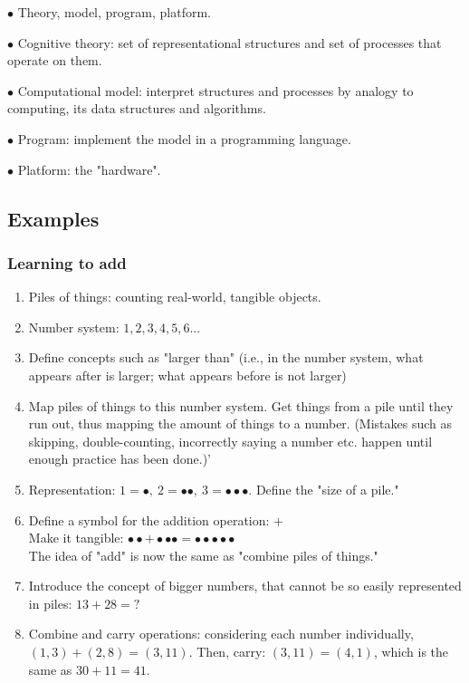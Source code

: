 \documentclass[english,openany]{book}
\begin{document}
$\bullet$ Theory, model, program, platform.

$\bullet$ Cognitive theory: set of representational structures and set of processes that operate on them.

$\bullet$ Computational model: interpret structures and processes by analogy to computing, its data structures and algorithms.

$\bullet$ Program: implement the model in a programming language.

$\bullet$ Platform: the "hardware".

\subsection{Examples}

\subsubsection{Learning to add}

\begin{enumerate}
    \item Piles of things: counting real-world, tangible objects.

    \item Number system: $1, 2, 3, 4, 5, 6...$

    \item Define concepts such as "larger than" (i.e., in the number system, what appears after is larger; what appears before is not larger)
    
    \item Map piles of things to this number system. Get things from a pile until they run out, thus mapping the amount of things to a number. (Mistakes such as skipping, double-counting, incorrectly saying a number etc. happen until enough practice has been done.)'
    
    \item Representation: $1 = \bullet,\ 2 = \bullet \bullet,\ 3 = \bullet \bullet \bullet$. Define the "size of a pile."
    
    \item Define a symbol for the addition operation: $+$\\ Make it tangible: $\bullet \bullet + \bullet \bullet \bullet = \bullet \bullet \bullet \bullet \bullet$\\
    The idea of "add" is now the same as "combine piles of things."
    
    \item Introduce the concept of bigger numbers, that cannot be so easily represented in piles: $13 + 28 = ?$
    
    \item Combine and carry operations: considering each number individually, $(1, 3) + (2, 8) = (3, 11)$. Then, carry: $(3, 11) = (4, 1)$, which is the same as $30 + 11 = 41$.
\end{enumerate}
\end{document}
